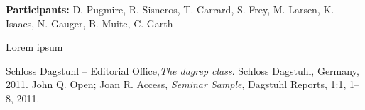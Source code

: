 
\license

\textbf{\sffamily Participants:} D. Pugmire, R. Sisneros, T. Carrard, S. Frey, M. Larsen, K. Isaacs, N. Gauger, B. Muite, C. Garth

\bigskip\noindent
Lorem ipsum

\begin{thebibliography}{0}
 Schloss Dagstuhl -- Editorial Office,\textsl{The dagrep class}. Schloss Dagstuhl, Germany, 2011.
 John Q. Open; Joan R. Access, \textsl{Seminar Sample}, Dagstuhl Reports, 1:1, 1--8, 2011.
\end{thebibliography}


